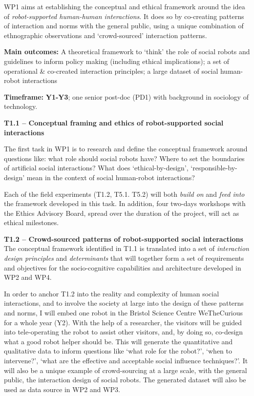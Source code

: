 WP1 aims at establishing the conceptual and ethical framework around the idea of
\emph{robot-supported human-human interactions}. It does so by co-creating
patterns of interaction and norms with the general public, using a unique
combination of ethnographic observations and `crowd-sourced' interaction
patterns.

\begin{framed}
    \textbf{Main outcomes:} A theoretical framework to `think' the role of
    social robots and guidelines to inform policy making (including ethical
    implications); a set of operational \& co-created interaction principles; a
    large dataset of social human-robot interactions

    \textbf{Timeframe:} \textbf{Y1-Y3}; one senior post-doc (PD1)
with background in sociology of technology.
\end{framed}


\textbf{T1.1 -- Conceptual framing and ethics of robot-supported social
interactions}


The first task in WP1 is to research and define the conceptual framework around
questions like: what role should social robots have? Where
to set the boundaries of artificial social interactions? What does
`ethical-by-design', `responsible-by-design' mean in the context of social
human-robot interactions? 

Each of the field experiments (T1.2, T5.1. T5.2) will both \emph{build on} and
\emph{feed into} the framework developed in this task. In addition, four
two-days workshops with the \project Ethics Advisory Board, spread over the
duration of the project, will act as ethical milestones.

\textbf{T1.2 -- Crowd-sourced patterns of robot-supported social
interactions} The conceptual framework identified in T1.1 is translated
into a set of \emph{interaction design principles} and \emph{determinants} that
will together form a set of requirements and objectives for the socio-cognitive
capabilities and architecture developed in WP2 and WP4.

In order to anchor T1.2 into the reality and complexity of human social
interactions, and to involve the society at large into the design of these
patterns and norms, I will embed one \project robot in the Bristol Science
Centre WeTheCurious for a whole year (Y2). With the help of a researcher, the
visitors will be guided into tele-operating the robot to assist other visitors,
and, by doing so, co-design what a good robot helper should be. This will
generate the quantitative and qualitative data to inform questions like `what
role for the robot?', `when to intervene?', `what are the effective and
acceptable social influence techniques?'. It will also be a unique example of
crowd-sourcing at a large scale, with the general public, the interaction design
of social robots.  The generated dataset will also be used as data source in WP2
and WP3.

